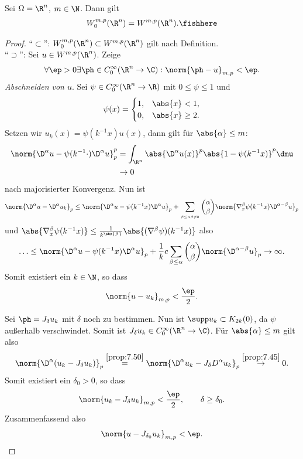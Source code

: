 \begin{prop}
\label{prop:7.51}
Sei $\Omega=\R^n$, $m\in\N$. Dann gilt
\begin{align*}
W_0^{m,p}(\R^n) = W^{m,p}(\R^n).\fishhere
\end{align*}
\end{prop}
\begin{proof}
``$\subset$'': $W_0^{m,p}(\R^n)\subset W^{m,p}(\R^n)$ gilt nach Definition.\\
``$\supset$'': Sei $u\in W^{m,p}(\R^n)$. Zeige
\begin{align*}
\forall \ep > 0 \exists \ph\in C_0^\infty(\R^n\to\C) : \norm{\ph-u}_{m,p} < \ep.
\end{align*}
\textit{Abschneiden von $u$}. Sei $\psi\in C_0^\infty(\R^n\to\R)$ mit $0\le
\psi\le 1$ und
\begin{align*}
\psi(x) = 
\begin{cases}
1, & \abs{x}< 1,\\
0, & \abs{x} \ge 2.
\end{cases}
\end{align*}
Setzen wir $u_k(x) = \psi(k^{-1}x)u(x)$, dann gilt für $\abs{\alpha}\le m$:
\begin{align*}
\norm{\D^\alpha u-\psi(k^{-1}\cdot)\D^\alpha u}_p^p
&=
\int_{\R^n} \abs{\D^\alpha u(x)}^p\abs{1-\psi(k^{-1}x)}^p\dmu\\
&\to 0
\end{align*}
nach majorisierter Konvergenz. Nun ist
\begin{align*}
\norm{\D^\alpha u - \D^\alpha u_k}_p
\le \norm{\D^\alpha u - \psi(k^{-1}x)\D^\alpha u}_p
+ \sum_{\atop{\beta\le \alpha}{\beta\neq 0}}
\binom{\alpha}{\beta}
\norm{\nabla_x^\beta \psi(k^{-1}x)\D^{\alpha-\beta}u}_p
\end{align*}
und $\abs{\nabla_x^\beta \psi(k^{-1}x)} \le
\frac{1}{k^{\abs{\beta}}}\abs{(\nabla^\beta\psi)(k^{-1}x)}$ also
\begin{align*}
\ldots \le
\norm{\D^\alpha u - \psi(k^{-1}x)\D^\alpha u}_p
+ \frac{1}{k}c \sum_{\beta\le\alpha} \binom{\alpha}{\beta}
\norm{\D^{\alpha-\beta}u}_p
\to \infty.
\end{align*}
Somit existiert ein $k\in\N$, so dass
\begin{align*}
\norm{u-u_k}_{m,p} < \frac{\ep}{2}.
\end{align*}

Sei $\ph=J_\delta u_k$ mit $\delta$ noch zu bestimmen. Nun ist $\supp
u_k\subset K_{2k}(0)$, da $\psi$ außerhalb verschwindet. Somit ist $J_\delta
u_k\in C_0^\infty(\R^n\to\C)$. Für $\abs{\alpha}\le m$ gilt also
\begin{align*}
\norm{\D^\alpha(u_k-J_\delta u_k)}_p \overset{\ref{prop:7.50}}{=}
\norm{\D^\alpha u_k - J_\delta D^\alpha u_k}_p \overset{\ref{prop:7.45}}{\to}0.
\end{align*}
Somit existiert ein $\delta_0> 0$, so dass
\begin{align*}
\norm{u_k-J_{\delta}u_k}_{m,p}<\frac{\ep}{2},\qquad \delta \ge \delta _0.
\end{align*}
Zusammenfassend also
\begin{align*}
\norm{u-J_{\delta_0}u_k}_{m,p} < \ep.\qedhere
\end{align*}
\end{proof}

